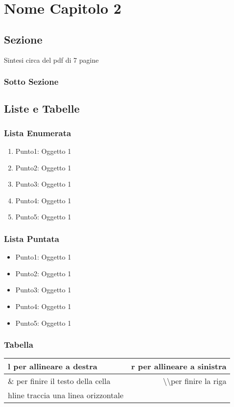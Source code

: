\documentclass[./../NomeDocumento.tex]{subfiles}
\begin{document}
\chapter{Nome Capitolo 2}
\section{Sezione}
\label{Sezione}
Sintesi circa del pdf di 7 pagine 
\subsection{Sotto Sezione}
\lipsum[20]

\section{Liste e Tabelle}
\lipsum[15]
\newpage

\subsection{Lista Enumerata}
\begin{enumerate}
	\item{Punto1:} Oggetto 1 
	\item{Punto2:} Oggetto 1 
	\item{Punto3:} Oggetto 1 
	\item{Punto4:} Oggetto 1 
	\item{Punto5:} Oggetto 1 
\end{enumerate}

\subsection{Lista Puntata}
\begin{itemize}
	\item{Punto1:} Oggetto 1 
	\item{Punto2:} Oggetto 1 
	\item{Punto3:} Oggetto 1 
	\item{Punto4:} Oggetto 1 
	\item{Punto5:} Oggetto 1 
\end{itemize}


\subsection{Tabella}
\begin{tabular}{ | l |  r | }
	\hline
	l per allineare a destra & r per allineare a sinistra \\
	\hline
	\& per finire il testo della cella  &\textbackslash\textbackslash per finire la riga \\
	\hline
	hline traccia una linea orizzontale \\
	\hline
	
\end{tabular}
\end{document}
